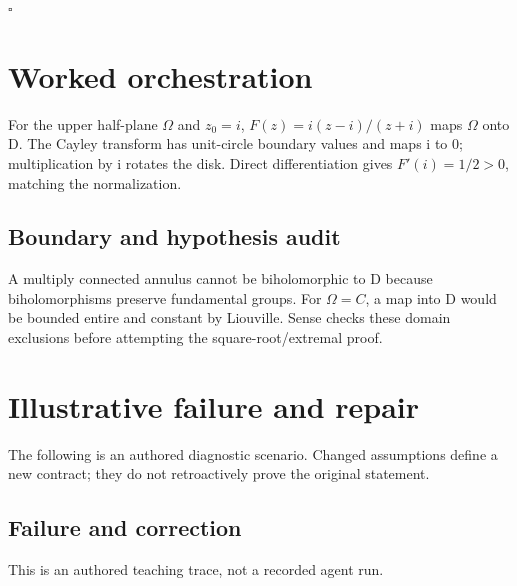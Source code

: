 \documentclass[preprint,12pt,aps,pra,showkeys,amsmath,amssymb,superscriptaddress,floatfix]{revtex4-2}
\theoremstyle{definition}
\theoremstyle{remark}
\begin{document}
\hfill$\square$

\section{Worked orchestration}

For the upper half-plane \(\Omega\) and \(z_{0}=i\),
\(F(z)=i(z-i)/(z+i)\) maps \(\Omega\) onto D. The Cayley transform has
unit-circle boundary values and maps i to 0; multiplication by i rotates
the disk. Direct differentiation gives \(F'(i)=1/2>0\), matching the
normalization.

\subsection{Boundary and hypothesis audit}

A multiply connected annulus cannot be biholomorphic to D because
biholomorphisms preserve fundamental groups. For \(\Omega =C\), a map
into D would be bounded entire and constant by Liouville. Sense checks
these domain exclusions before attempting the square-root/extremal
proof.

\section{Illustrative failure and repair}

The following is an authored diagnostic scenario. Changed assumptions
define a new contract; they do not retroactively prove the original
statement.

\subsection{Failure and correction}
This is an authored teaching trace, not a recorded agent run.
\end{document}
